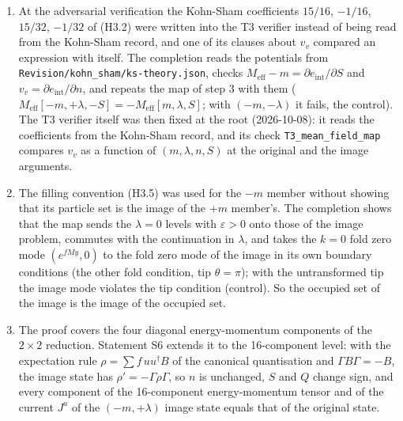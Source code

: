 \documentclass[11pt]{article}
\begin{document}
\begin{enumerate}
\item At the adversarial verification the Kohn-Sham coefficients $15/16$, $-1/16$, $15/32$, $-1/32$ of (H3.2) were written into the T3 verifier instead of being read from the Kohn-Sham record, and one of its clauses about $v_v$ compared an expression with itself. The completion reads the potentials from \texttt{Revision\allowbreak{}/kohn\_sh\allowbreak{}am/ks-th\allowbreak{}eory.jso\allowbreak{}n}, checks $M_{\mathrm{eff}} - m = \partial e_{\mathrm{int}}/\partial S$ and $v_v = \partial e_{\mathrm{int}}/\partial n$, and repeats the map of step 3 with them ($M_{\mathrm{eff}}[-m,+\lambda,-S] = -M_{\mathrm{eff}}[m,\lambda,S]$; with $(-m,-\lambda)$ it fails, the control). The T3 verifier itself was then fixed at the root (2026-10-08): it reads the coefficients from the Kohn-Sham record, and its check \texttt{T3\_mean\_\allowbreak{}field\_ma\allowbreak{}p} compares $v_v$ as a function of $(m,\lambda,n,S)$ at the original and the image arguments.
\item The filling convention (H3.5) was used for the $-m$ member without showing that its particle set is the image of the $+m$ member's. The completion shows that the map sends the $\lambda = 0$ levels with $\varepsilon > 0$ onto those of the image problem, commutes with the continuation in $\lambda$, and takes the $k = 0$ fold zero mode $(e^{fMy}, 0)$ to the fold zero mode of the image in its own boundary conditions (the other fold condition, tip $\theta = \pi$); with the untransformed tip the image mode violates the tip condition (control). So the occupied set of the image is the image of the occupied set.
\item The proof covers the four diagonal energy-momentum components of the $2 \times 2$ reduction. Statement S6 extends it to the 16-component level: with the expectation rule $\rho = \sum f\,uu^\dagger B$ of the canonical quantisation and $\Gamma B\Gamma = -B$, the image state has $\rho' = -\Gamma\rho\Gamma$, so $n$ is unchanged, $S$ and $Q$ change sign, and every component of the 16-component energy-momentum tensor and of the current $J^a$ of the $(-m,+\lambda)$ image state equals that of the original state.
\end{enumerate}
\end{document}
